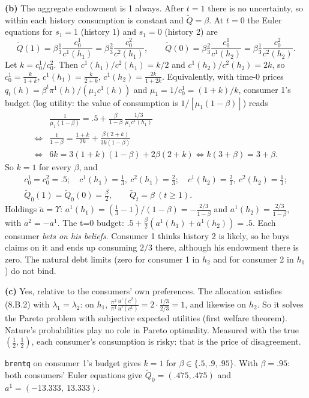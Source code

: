 \documentclass[12pt, letterpaper]{article}
\begin{document}
\begin{tcolorbox}[oddbox,title={Exercise 8.15 \quad Diverse beliefs, I}]
\textbf{(b)} The aggregate endowment is 1 always. After $t=1$ there is no uncertainty, so within each history
consumption is constant and $\tilde Q=\beta$. At $t=0$ the Euler equations for $s_1=1$ (history 1) and $s_1=0$
(history 2) are
\[
\tilde Q(1)=\beta\tfrac13\frac{c^1_0}{c^1(h_1)}=\beta\tfrac23\frac{c^2_0}{c^2(h_1)},\qquad
\tilde Q(0)=\beta\tfrac23\frac{c^1_0}{c^1(h_2)}=\beta\tfrac13\frac{c^2_0}{c^2(h_2)} .
\]
Let $k=c^1_0/c^2_0$. Then $c^1(h_1)/c^2(h_1)=k/2$ and $c^1(h_2)/c^2(h_2)=2k$, so
$c^1_0=\frac{k}{1+k}$, $c^1(h_1)=\frac{k}{2+k}$, $c^1(h_2)=\frac{2k}{1+2k}$. Equivalently, with time-0 prices
$q_t(h)=\beta^t\pi^1(h)/(\mu_1c^1(h))$ and $\mu_1=1/c^1_0=(1+k)/k$, consumer 1's budget (log utility: the value of
consumption is $1/[\mu_1(1-\beta)]$) reads
\begin{align*}
&\frac{1}{\mu_1(1-\beta)}=.5+\frac{\beta}{1-\beta}\,\frac{1/3}{\mu_1c^1(h_1)}\\
\iff&\frac{1}{1-\beta}=\frac{1+k}{2k}+\frac{\beta(2+k)}{3k(1-\beta)}\\
\iff&6k=3(1+k)(1-\beta)+2\beta(2+k)\iff k(3+\beta)=3+\beta .
\end{align*}
So $k=1$ for every $\beta$, and
\[
\boxed{\begin{gathered}c^1_0=c^2_0=.5;\quad c^1(h_1)=\tfrac13,\ c^2(h_1)=\tfrac23;\quad c^1(h_2)=\tfrac23,\ c^2(h_2)=\tfrac13;\\
\tilde Q_0(1)=\tilde Q_0(0)=\tfrac\beta2,\qquad\tilde Q_t=\beta\ (t\ge1).\end{gathered}}
\]
Holdings $\tilde a=\Upsilon$: $a^1(h_1)=(\tfrac13-1)/(1-\beta)=-\tfrac{2/3}{1-\beta}$ and $a^1(h_2)=\tfrac{2/3}{1-\beta}$,
with $a^2=-a^1$. The t=0 budget: $.5+\tfrac\beta2(a^1(h_1)+a^1(h_2))=.5$. \checkmark{} Each consumer
\emph{bets on his beliefs}. Consumer 1 thinks history 2 is likely, so he buys claims on it and ends up
consuming $2/3$ there, although his endowment there is zero. The natural debt limits (zero for consumer 1 in
$h_2$ and for consumer 2 in $h_1$) do not bind.

\textbf{(c)} Yes, relative to the consumers' own preferences. The allocation satisfies (8.B.2) with $\lambda_1=\lambda_2$:
on $h_1$, $\frac{\pi^2}{\pi^1}\frac{u'(c^2)}{u'(c^1)}=2\cdot\frac{1/3}{2/3}=1$, and likewise on $h_2$. So it solves the
Pareto problem with subjective expected utilities (first welfare theorem). Nature's probabilities play no role in
Pareto optimality. Measured with the true $(\frac12,\frac12)$, each consumer's consumption is risky: that is the price
of disagreement.

\begin{tcolorbox}[databox]
\texttt{brentq} on consumer 1's budget gives $k=1$ for $\beta\in\{.5,.9,.95\}$. With $\beta=.95$: both consumers'
Euler equations give $\tilde Q_0=(.475,.475)$ and $a^1=(-13.333,\ 13.333)$.
\end{tcolorbox}
\end{tcolorbox}
\end{document}
